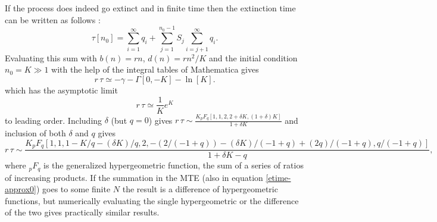 If the process does indeed go extinct and in finite time then the extinction time can be written as follows \cite{Nisbet1982}:
\begin{equation}%
\tau[n_0] = \sum_{i=1}^{\infty}q_i + \sum_{j=1}^{n_0-1} S_j\sum_{i=j+1}^{\infty}q_i.
\end{equation}
Evaluating this sum with $b(n)=r n$, $d(n)=rn^2/K$ and the initial condition $n_0 = K \gg 1$ with the help of the integral tables of Mathematica gives
\begin{equation*}
r\,\tau \simeq -\gamma - \Gamma[0,-K] - \ln[K].
\end{equation*}
which has the asymptotic limit \cite{Lande1993,Lambert2005}
\begin{equation}%
r\,\tau \simeq \frac{1}{K}e^K
\label{1Dlog-appendix}
\end{equation}
to leading order.
Including $\delta$ (but $q=0$) gives
$r\,\tau \sim \frac{K {}_pF_q[{1, 1}, {2, 2 + \delta K}, (1 + \delta) K]}{1 + \delta K}$
and inclusion of both $\delta$ and $q$ gives
\begin{equation}
r\,\tau \sim \frac{K {}_pF_q[{1, 1, 1 - K/q - (\delta K)/q}, {2, -(2/(-1 + q)) - (\delta K)/(-1 + q) + (2 q)/(-1 + q)}, q/(-1 + q)]}{1 + \delta K - q},
\end{equation}
where ${}_pF_q$ is the generalized hypergeometric function, the sum of a series of ratios of increasing products. 
If the summation in the MTE (also in equation \ref{etime-approx0}) goes to some finite $N$ the result is a difference of hypergeometric functions, but numerically evaluating the single hypergeometric or the difference of the two gives practically similar results. 


